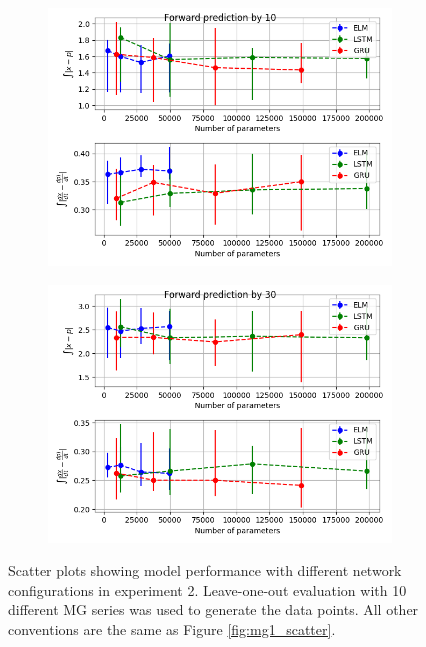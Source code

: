 \documentclass[11pt]{article}
\begin{document}
\begin{figure}
\begin{center}
\begin{subfigure}{.48\textwidth}
     \includegraphics[width=\textwidth]{figures/mg2_scatter_10.png}
     \caption{}
   \end{subfigure}
   \begin{subfigure}{.48\textwidth}
     \includegraphics[width=\textwidth]{figures/mg2_scatter_30.png}
     \caption{}
   \end{subfigure}
       
    \caption{Scatter plots showing model performance with different
      network configurations in experiment 2. Leave-one-out evaluation with 10 different MG series was used to generate the data points. All other conventions are the same as Figure \ref{fig:mg1_scatter}.}
    \label{fig:mg2_scatter}
    \end{center}
  \end{figure}
\end{document}
